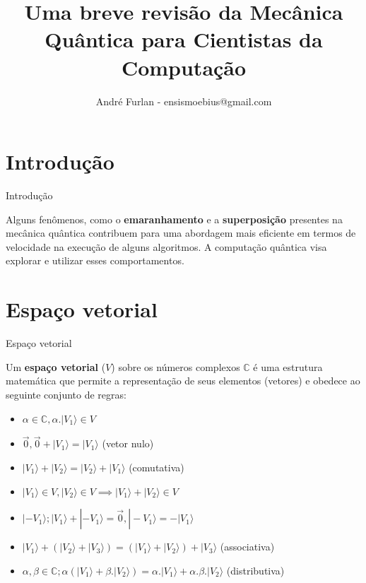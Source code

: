 

\title{Uma breve revisão da Mecânica Quântica para Cientistas da Computação}


\author{André Furlan - ensismoebius@gmail.com}

\date{\the\year}


	
	\frame{\titlepage}
	
	\section{Introdução}
	
	\begin{frame}{Introdução}
		
		\par Alguns fenômenos, como o \textbf{emaranhamento} e a \textbf{superposição} presentes na mecânica quântica contribuem para uma abordagem mais eficiente em termos de velocidade na execução de alguns algoritmos. A computação quântica visa explorar e utilizar esses comportamentos.
	\end{frame}

	\section{Espaço vetorial}
	
	\begin{frame}{Espaço vetorial}
		\par Um \textbf{espaço vetorial} ($V$) sobre os números complexos $\mathbb{C}$ é uma estrutura matemática que permite a representação de seus elementos (vetores) e obedece ao seguinte conjunto de regras:
		\begin{itemize}
			\item $\alpha \in \mathbb{C}, \alpha . |V_1\rangle \in V$
			\item $\vec{0} , \vec{0} + |V_1\rangle = |V_1\rangle$ (vetor nulo)
			\item $|V_1\rangle + |V_2\rangle = |V_2\rangle + |V_1\rangle$ (comutativa)
			\item $|V_1\rangle \in V, |V_2\rangle \in V \implies |V_1\rangle + |V_2\rangle \in V$
			\item $|-V_1\rangle; |V_1\rangle + |-V_1\rangle=\vec{0}, |-V_1\rangle=-|V_1\rangle$ 
			\item $|V_1\rangle + (|V_2\rangle + |V_3\rangle) = (|V_1\rangle + |V_2\rangle) + |V_3\rangle$ (associativa)
			\item $\alpha,\beta \in \mathbb{C}; \alpha (|V_1\rangle + \beta . |V_2\rangle) = \alpha . |V_1\rangle + \alpha . \beta . |V_2\rangle $ (distributiva)
		\end{itemize}
	\end{frame}

